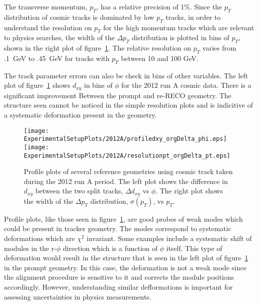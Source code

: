 The transverse momentum, $p_T$, has a relative precision of 1\%.  Since the $p_T$
distribution of cosmic tracks is dominated by low $p_T$ tracks, in order to 
understand the resolution on $p_T$ for the high momentum tracks which are relevant
to physics searches, the width of the $\Delta p_T$ distribution is plotted in 
bins of $p_T$, shown in the right plot of figure~\ref{fig:trackSplittingProfiles}.  
The relative resolution on $p_T$ varies from .1~GeV to .45~GeV for tracks with
$p_T$ between 10 and 100 GeV.

The track parameter errors can also be check in bins of other
variables.  The left plot of figure~\ref{fig:trackSplittingProfiles} shows 
$d_{xy}$ in bins of $\phi$ for the 2012 run A cosmic data.  
There is a significant improvement Between the prompt and re-RECO geometry.  
The structure seen cannot be noticed in the simple
resolution plots and is indicitive of a systematic deformation present in
the geometry.  

\begin{figure}
\begin{center}
\texttt{[image: ExperimentalSetupPlots/2012A/profiledxy\_orgDelta\_phi.eps]}
\texttt{[image: ExperimentalSetupPlots/2012A/resolutionpt\_orgDelta\_pt.eps]}
\caption{Profile plots of several reference geometries using cosmic track
taken during the 2012 run A period.  The left plot shows the difference 
in $d_{xy}$ between the two split tracks, $\Delta d_{xy}$ vs $\phi$.  The 
right plot shows the width of the $\Delta p_T$ distribution, $\sigma(p_T)$, 
vs $p_T$.}
\label{fig:trackSplittingProfiles}
\end{center}
\end{figure}

Profile plots, like those seen in figure~\ref{fig:trackSplittingProfiles}, 
are good probes of weak modes which could be present in
tracker geometry.  The modes correspond to systematic deformations which 
are $\chi^2$ invariant.  Some examples include a systematic shift of modules
in the r-$\phi$ direction which is a function of $\phi$ itself.  This 
type of deformation would result in the structure that is seen in the 
left plot of figure~\ref{fig:trackSplittingProfiles} in the prompt geometry.
In this case, the deformation is not a weak mode since the alignment 
procedure is sensitive to it and corrects the module positions accordingly.  However, understanding similar defformations is important for assessing uncertainties in physics measurements.  

